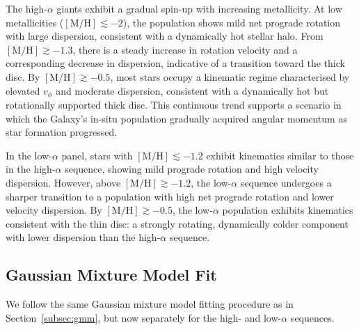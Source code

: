 \documentclass[a4paper,12pt]{article}
\begin{document}
The high-$\alpha$ giants 
exhibit a gradual spin-up with increasing metallicity.  
At low metallicities ($[\mathrm{M/H}]\lesssim -2$), the population 
shows mild net prograde rotation with large dispersion, 
consistent with a dynamically hot stellar halo. From $[\mathrm{M/H}]\gtrsim -1.3$, 
there is a steady increase in rotation velocity and a corresponding decrease in 
dispersion, indicative of a transition toward the thick disc.  
By $[\mathrm{M/H}]\gtrsim -0.5$, most stars occupy a kinematic regime characterised 
by elevated $v_\phi$ and moderate dispersion, consistent with a dynamically hot 
but rotationally supported thick disc. This continuous trend supports 
a scenario in which the Galaxy’s in-situ population gradually acquired angular 
momentum as star formation progressed.


In the low-$\alpha$ panel, stars with $[\mathrm{M/H}]\lesssim -1.2$ exhibit kinematics similar 
to those in the high-$\alpha$ sequence, showing mild prograde rotation and high velocity dispersion. 
However, above $[\mathrm{M/H}]\gtrsim -1.2$, the low-$\alpha$ sequence 
undergoes a sharper transition to a population with high net prograde rotation and lower velocity dispersion. 
By $[\mathrm{M/H}]\gtrsim -0.5$, the low-$\alpha$ population exhibits kinematics consistent with the thin disc: 
a strongly rotating, dynamically colder component with lower dispersion than the high-$\alpha$ sequence.

\subsection{Gaussian Mixture Model Fit}

We follow the same Gaussian mixture model fitting procedure as in
Section~\ref{subsec:gmm}, but now separately for the high- and low-$\alpha$ sequences.

\begin{table}[H]
  \centering
  \caption{Number of Gaussian Mixture components selected by the BIC for each metallicity bin, split by $\alpha$-sequence.}
    \label{tab:gmm_components_alpha}
\end{table}
\end{document}
